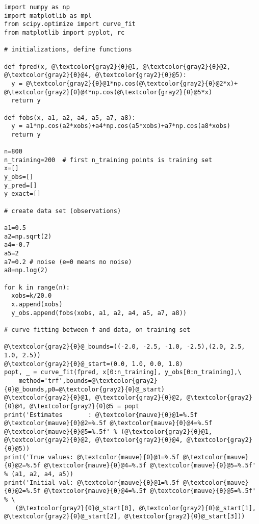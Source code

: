\documentclass[oneside,10pt]{book}
\renewcommand{\arraystretch}{1.4} %
\begin{document}
\renewcommand{\arraystretch}{1.0} %
\renewcommand{\arraystretch}{1.4} %


%

\begin{lstlisting}[escapechar=@]
import numpy as np
import matplotlib as mpl
from scipy.optimize import curve_fit
from matplotlib import pyplot, rc

# initializations, define functions

def fpred(x, @\textcolor{gray2}{θ}@1, @\textcolor{gray2}{θ}@2, @\textcolor{gray2}{θ}@4, @\textcolor{gray2}{θ}@5):
  y = @\textcolor{gray2}{θ}@1*np.cos(@\textcolor{gray2}{θ}@2*x)+ @\textcolor{gray2}{θ}@4*np.cos(@\textcolor{gray2}{θ}@5*x)
  return y

def fobs(x, a1, a2, a4, a5, a7, a8):
  y = a1*np.cos(a2*xobs)+a4*np.cos(a5*xobs)+a7*np.cos(a8*xobs)
  return y

n=800
n_training=200  # first n_training points is training set
x=[]
y_obs=[]
y_pred=[]
y_exact=[]

# create data set (observations)

a1=0.5
a2=np.sqrt(2)
a4=-0.7
a5=2
a7=0.2 # noise (e=0 means no noise)
a8=np.log(2)

for k in range(n):
  xobs=k/20.0
  x.append(xobs)
  y_obs.append(fobs(xobs, a1, a2, a4, a5, a7, a8))

# curve fitting between f and data, on training set

@\textcolor{gray2}{θ}@_bounds=((-2.0, -2.5, -1.0, -2.5),(2.0, 2.5, 1.0, 2.5))
@\textcolor{gray2}{θ}@_start=(0.0, 1.0, 0.0, 1.8)
popt, _ = curve_fit(fpred, x[0:n_training], y_obs[0:n_training],\
    method='trf',bounds=@\textcolor{gray2}{θ}@_bounds,p0=@\textcolor{gray2}{θ}@_start)
@\textcolor{gray2}{θ}@1, @\textcolor{gray2}{θ}@2, @\textcolor{gray2}{θ}@4, @\textcolor{gray2}{θ}@5 = popt
print('Estimates       : @\textcolor{mauve}{θ}@1=%.5f @\textcolor{mauve}{θ}@2=%.5f @\textcolor{mauve}{θ}@4=%.5f @\textcolor{mauve}{θ}@5=%.5f' % (@\textcolor{gray2}{θ}@1, @\textcolor{gray2}{θ}@2, @\textcolor{gray2}{θ}@4, @\textcolor{gray2}{θ}@5))
print('True values: @\textcolor{mauve}{θ}@1=%.5f @\textcolor{mauve}{θ}@2=%.5f @\textcolor{mauve}{θ}@4=%.5f @\textcolor{mauve}{θ}@5=%.5f' % (a1, a2, a4, a5))
print('Initial val: @\textcolor{mauve}{θ}@1=%.5f @\textcolor{mauve}{θ}@2=%.5f @\textcolor{mauve}{θ}@4=%.5f @\textcolor{mauve}{θ}@5=%.5f' % \
   (@\textcolor{gray2}{θ}@_start[0], @\textcolor{gray2}{θ}@_start[1], @\textcolor{gray2}{θ}@_start[2], @\textcolor{gray2}{θ}@_start[3]))


\end{lstlisting}
\end{document}

